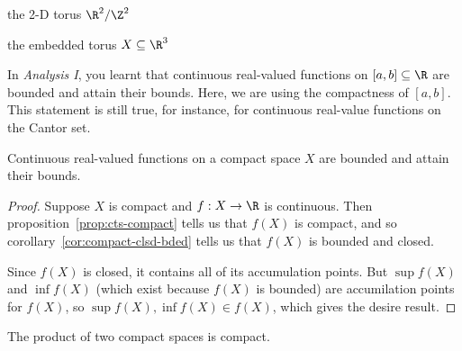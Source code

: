 \begin{example}
\begin{center}
\begin{minipage}{0.45\textwidth}
		\end{minipage}
	\end{center}

	\begin{center}
		\begin{minipage}{0.5\textwidth}
			\centering
			the 2-D torus $\R^2/\Z^2$
		\end{minipage}
		\begin{minipage}{0.45\textwidth}
			\centering
			the embedded torus $X\subseteq \R^3$
		\end{minipage}
	\end{center}

	In \emph{Analysis I}, you learnt that continuous real-valued functions on $[a,b]\subseteq\R$ are bounded and attain their bounds. Here, we are using the compactness of $[a,b]$. This statement is still true, for instance, for continuous real-value functions on the Cantor set.
\end{example}

\begin{proposition}
	Continuous real-valued functions on a compact space $X$ are bounded and attain their bounds.
\end{proposition}

\begin{proof}
	Suppose $X$ is compact and $f:X\to\R$ is continuous. Then proposition~\ref{prop:cts-compact} tells us that $f(X)$ is compact, and so corollary~\ref{cor:compact-clsd-bded} tells us that $f(X)$ is bounded and closed.

	Since $f(X)$ is closed, it contains all of its accumulation points. But $\sup f(X)$ and $\inf f(X)$ (which exist because $f(X)$ is bounded) are accumilation points for $f(X)$, so $\sup f(X), \inf f(X) \in f(X)$, which gives the desire result.
\end{proof}

\begin{theorem}
	The product of two compact spaces is compact.
\end{theorem}


